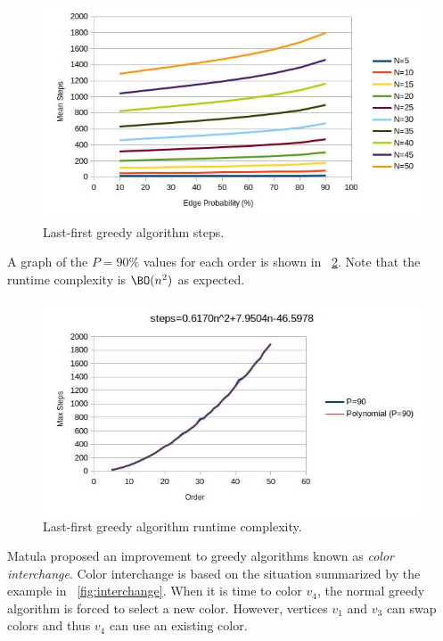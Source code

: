 \begin{figure}[H]
  \centering
  \includegraphics[width=5in]{greedy_steps}
  \caption{Last-first greedy algorithm steps.}
  \label{fig:greedy:steps}
\end{figure}

A graph of the \(P=90\%\) values for each order is shown in \figurename~\ref{fig:greedy:runtime}.  Note that the
runtime complexity is \(\BO(n^2)\) as expected.

\begin{figure}[H]
  \centering
  \includegraphics[width=5in]{greedy_runtime}
  \caption{Last-first greedy algorithm runtime complexity.}
  \label{fig:greedy:runtime}
\end{figure}

Matula proposed an improvement to greedy algorithms known as \emph{color interchange}.  Color interchange is based
on the situation summarized by the example in \figurename~\ref{fig:interchange}.  When it is time to color \(v_4\),
the normal greedy algorithm is forced to select a new color.  However, vertices \(v_1\) and \(v_3\) can swap colors
and thus \(v_4\) can use an existing color.

